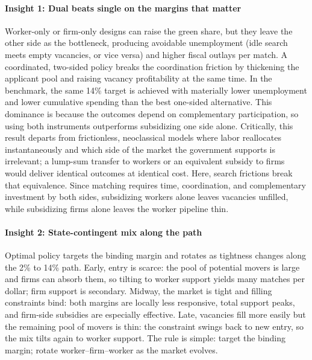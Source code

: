 \documentclass[preprint,12pt]{elsarticle}
\begin{document}
\paragraph{Insight 1: Dual beats single on the margins that matter}
Worker-only or firm-only designs can raise the green share, but they leave the other side as the bottleneck, producing avoidable unemployment (idle search meets empty vacancies, or vice versa) and higher fiscal outlays per match. A coordinated, two-sided policy breaks the coordination friction by thickening the applicant pool and raising vacancy profitability at the same time. In the benchmark, the same 14\% target is achieved with materially lower unemployment and lower cumulative spending than the best one-sided alternative. This dominance is because the outcomes depend on complementary participation, so using both instruments outperforms subsidizing one side alone. Critically, this result departs from frictionless, neoclassical models where labor reallocates instantaneously and which side of the market the government supports is irrelevant; a lump-sum transfer to workers or an equivalent subsidy to firms would deliver identical outcomes at identical cost. Here, search frictions break that equivalence. Since matching requires time, coordination, and complementary investment by both sides, subsidizing workers alone leaves vacancies unfilled, while subsidizing firms alone leaves the worker pipeline thin.

\paragraph{Insight 2: State-contingent mix along the path}
Optimal policy targets the binding margin and rotates as tightness changes along the 2\% to 14\% path. Early, entry is scarce: the pool of potential movers is large and firms can absorb them, so tilting to worker support yields many matches per dollar; firm support is secondary. Midway, the market is tight and filling constraints bind: both margins are locally less responsive, total support peaks, and firm-side subsidies are especially effective. Late, vacancies fill more easily but the remaining pool of movers is thin: the constraint swings back to new entry, so the mix tilts again to worker support. The rule is simple: target the binding margin; rotate worker–firm–worker as the market evolves.
\end{document}
